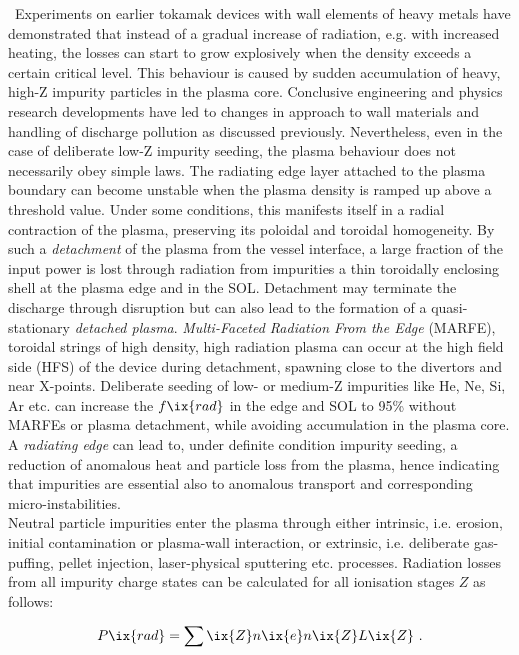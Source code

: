             \,\newline%
            Experiments on earlier tokamak devices with wall elements of heavy metals have demonstrated that instead of a gradual increase of radiation, e.g. with increased heating, the losses can start to grow explosively when the density exceeds a certain critical level. This behaviour is caused by sudden accumulation of heavy, high-Z impurity particles in the plasma core. Conclusive engineering and physics research developments have led to changes in approach to wall materials and handling of discharge pollution as discussed previously. Nevertheless, even in the case of deliberate low-Z impurity seeding, the plasma behaviour does not necessarily obey simple laws. The radiating edge layer attached to the plasma boundary can become unstable when the plasma density is ramped up above a threshold value. Under some conditions, this manifests itself in a radial contraction of the plasma, preserving its poloidal and toroidal homogeneity. By such a \textit{detachment} of the plasma from the vessel interface, a large fraction of the input power is lost through radiation from impurities a thin toroidally enclosing shell at the plasma edge and in the SOL. Detachment may terminate the discharge through disruption but can also lead to the formation of a quasi-stationary \textit{detached plasma}. \textit{Multi-Faceted Radiation From the Edge} (MARFE), toroidal strings of high density, high radiation plasma can occur at the high field side (HFS) of the device during detachment, spawning close to the divertors and near X-points\cite{Wenzel2018}. Deliberate seeding of low- or medium-Z impurities like He, Ne, Si, Ar etc. can increase the $f\ix{rad}$ in the edge and SOL to 95\% without MARFEs or plasma detachment, while avoiding accumulation in the plasma core. A \textit{radiating edge} can lead to, under definite condition impurity seeding, a reduction of  anomalous heat and particle loss from the plasma, hence indicating that impurities are essential also to anomalous transport and corresponding micro-instabilities\cite{Baker1982,Greenwald2002,Lipschultz1984}.\\%
            Neutral particle impurities enter the plasma through either intrinsic, i.e. erosion, initial contamination or plasma-wall interaction, or extrinsic, i.e. deliberate gas-puffing, pellet injection, laser-physical sputtering etc. processes. Radiation losses from all impurity charge states can be calculated for all ionisation stages $Z$ as follows:

            \begin{align}%
                P\ix{rad}=\sum\ix{Z}n\ix{e}n\ix{Z}L\ix{Z}\,\,.\nonumber%
            \end{align}%

